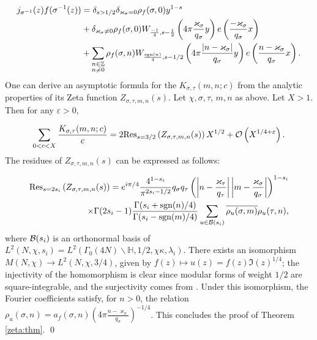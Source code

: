 \documentclass[leqno,10pt]{amsart}
\theoremstyle{plain}
\numberwithin{equation}{section}
\theoremstyle{definition}
\theoremstyle{remark}
\begin{document}
\begin{equation*}
\begin{split}
j_{\sigma^{-1}}(z) f(\sigma^{-1}(z)) 
&= \delta_{s>1/2}\delta_{\varkappa_\sigma=0} \rho_f(\sigma,0)y^{1-s} \\
&+ \delta_{\varkappa_\sigma\neq 0} \rho_f(\sigma,0) W_{\frac{-1}{4},s-\frac{1}{2}} \left(4\pi \frac{\varkappa_\sigma}{q_\sigma} y\right) e\left( \frac{-\varkappa_\sigma}{q_\sigma}x\right)\\
&+ \sum_{\substack{n\in \mathbb{Z}\\ n\neq 0}}\rho_f(\sigma,n) W_{\frac{\textnormal{sgn}(n)}{4}, s-1/2}\left(4\pi \frac{\vert n-\varkappa_\sigma\vert}{q_\sigma}y\right) e\left(\frac{n-\varkappa_\sigma}{q_\sigma}x\right).
\end{split}
\end{equation*}
One can derive an asymptotic formula for the $K_{\sigma,\tau}(m,n;c)$ from the analytic properties of its Zeta function $Z_{\sigma,\tau,m,n}(s)$. Let $\chi, \sigma,\tau$, $m,n$ as above. Let $X>1$. Then for any $\varepsilon>0$,

\begin{equation*}
\sum_{0<c < X} \frac{K_{\sigma,\tau}(m,n;c)}{c} =  2 \textnormal{Res}_{s=3/2}\left( Z_{\sigma,\tau,m,n}(s)\right) X^{1/2} + \mathcal{O}\left( X^{1/4+\varepsilon}\right).
\end{equation*}
The residues of $Z_{\sigma,\tau,m,n}(s)$ can be expressed as follows:  

\begin{equation*}
\begin{split}
\textnormal{Res}_{s=2s_i} \left(Z_{\sigma,\tau,m,n}(s)\right)
= e^{i\pi/4} \frac{4^{1-s_i}}{\pi^{2s_i-1/2}}  q_\sigma q_\tau \left(\left\vert n-\frac{\varkappa_\tau}{q_\tau}\right\vert \left\vert m-\frac{\varkappa_\sigma}{q_\sigma}\right\vert \right)^{1-s_i}\\
\times \Gamma(2s_i-1) \frac{\Gamma(s_i + \textnormal{sgn}(n)/4)}{\Gamma(s_i - \textnormal{sgn}(m)/4)} \sum_{u\in \mathcal{B}(s_i)} \overline{\rho_u(\sigma,m)} \rho_u(\tau,n),
\end{split}
\end{equation*}
where $\mathcal{B}(s_i)$ is an orthonormal basis of $L^2(N,\chi,s_i)=L^2\left(\Gamma_0(4N)\backslash \mathbb{H}, 1/2, \chi\kappa, \lambda_i\right)$.
There exists an isomorphism $M(N,\chi)\rightarrow L^2(N,\chi,3/4)$, given by $f(z)\mapsto u(z)=f(z)\Im(z)^{1/4}$; the injectivity of the homomorphism is clear since modular forms of weight $1/2$ are square-integrable, and the surjectivity comes from \cite[Satz\,9.1]{roe:autoformen}. Under this isomorphism, the Fourier coefficients satisfy, for $n >0$, the relation $\rho_u(\sigma,n)= a_f(\sigma,n) \left(4\pi \frac{n-\varkappa_\sigma}{q_\sigma}\right)^{-1/4}$. This concludes the proof of Theorem\,\ref{zeta:thm}.
\qed
\end{document}
